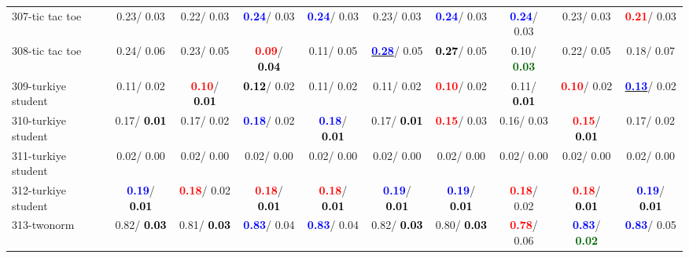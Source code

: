\begin{table}[h]
\begin{center}
{\begin{tabular}{lc|c|c|c|c|c|c|c|c}
307-tic tac toe &   0.23/  0.03 &   0.22/  0.03 & \textcolor{blue}{\textbf{  0.24}}/  0.03 & \textcolor{blue}{\textbf{  0.24}}/  0.03 &   0.23/  0.03 & \textcolor{blue}{\textbf{  0.24}}/  0.03 & \textcolor{blue}{\textbf{  0.24}}/  0.03 &   0.23/  0.03 & \textcolor{red}{\textbf{  0.21}}/  0.03 \\
308-tic tac toe &   0.24/  0.06 &   0.23/  0.05 & \textcolor{red}{\textbf{  0.09}}/\textcolor{black}{\textbf{  0.04}} &   0.11/  0.05 & \underline{\textcolor{blue}{\textbf{  0.28}}}/  0.05 & \textcolor{black}{\textbf{  0.27}}/  0.05 &   0.10/\textcolor{darkgreen}{\textbf{  0.03}} &   0.22/  0.05 &   0.18/  0.07 \\
309-turkiye student &   0.11/  0.02 & \textcolor{red}{\textbf{  0.10}}/\textcolor{black}{\textbf{  0.01}} & \textcolor{black}{\textbf{  0.12}}/  0.02 &   0.11/  0.02 &   0.11/  0.02 & \textcolor{red}{\textbf{  0.10}}/  0.02 &   0.11/\textcolor{black}{\textbf{  0.01}} & \textcolor{red}{\textbf{  0.10}}/  0.02 & \underline{\textcolor{blue}{\textbf{  0.13}}}/  0.02 \\ \hline
310-turkiye student &   0.17/\textcolor{black}{\textbf{  0.01}} &   0.17/  0.02 & \textcolor{blue}{\textbf{  0.18}}/  0.02 & \textcolor{blue}{\textbf{  0.18}}/\textcolor{black}{\textbf{  0.01}} &   0.17/\textcolor{black}{\textbf{  0.01}} & \textcolor{red}{\textbf{  0.15}}/  0.03 &   0.16/  0.03 & \textcolor{red}{\textbf{  0.15}}/\textcolor{black}{\textbf{  0.01}} &   0.17/  0.02 \\
311-turkiye student &   0.02/  0.00 &   0.02/  0.00 &   0.02/  0.00 &   0.02/  0.00 &   0.02/  0.00 &   0.02/  0.00 &   0.02/  0.00 &   0.02/  0.00 &   0.02/  0.00 \\
312-turkiye student & \textcolor{blue}{\textbf{  0.19}}/\textcolor{black}{\textbf{  0.01}} & \textcolor{red}{\textbf{  0.18}}/  0.02 & \textcolor{red}{\textbf{  0.18}}/\textcolor{black}{\textbf{  0.01}} & \textcolor{red}{\textbf{  0.18}}/\textcolor{black}{\textbf{  0.01}} & \textcolor{blue}{\textbf{  0.19}}/\textcolor{black}{\textbf{  0.01}} & \textcolor{blue}{\textbf{  0.19}}/\textcolor{black}{\textbf{  0.01}} & \textcolor{red}{\textbf{  0.18}}/  0.02 & \textcolor{red}{\textbf{  0.18}}/\textcolor{black}{\textbf{  0.01}} & \textcolor{blue}{\textbf{  0.19}}/\textcolor{black}{\textbf{  0.01}} \\
313-twonorm &   0.82/\textcolor{black}{\textbf{  0.03}} &   0.81/\textcolor{black}{\textbf{  0.03}} & \textcolor{blue}{\textbf{  0.83}}/  0.04 & \textcolor{blue}{\textbf{  0.83}}/  0.04 &   0.82/\textcolor{black}{\textbf{  0.03}} &   0.80/\textcolor{black}{\textbf{  0.03}} & \textcolor{red}{\textbf{  0.78}}/  0.06 & \textcolor{blue}{\textbf{  0.83}}/\textcolor{darkgreen}{\textbf{  0.02}} & \textcolor{blue}{\textbf{  0.83}}/  0.05 \\

\end{tabular}}
\end{center}
\end{table}
